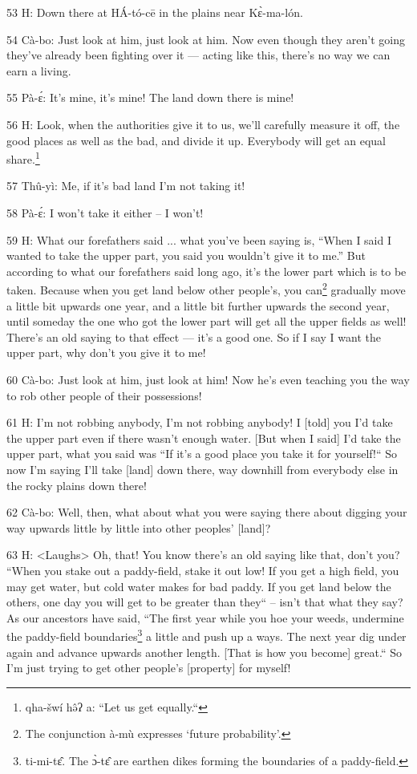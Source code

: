 53 H: Down there at HÁ-tó-cē in the plains near Kɛ̀-ma-lón.

54 Cà-bo: Just look at him, just look at him. Now even though they aren't going
they've already been fighting over it --- acting like this, there's no way we can
earn a living.

55 Pà-ɛ́: It's mine, it's mine! The land down there is mine!

56 H: Look, when the authorities give it to us, we'll carefully measure it off,
the good places as well as the bad, and divide it up. Everybody will get an equal
share.\footnote{qha-šwí hə̂ʔ a: ``Let us get equally.``}

57 Thû-yì: Me, if it's bad land I'm not taking it!

58 Pà-ɛ́: I won't take it either -- I won't!

59 H: What our forefathers said ... what you've been saying is, ``When I said I
wanted to take the upper part, you said you wouldn't give it to me.'' But according
to what our forefathers said long ago, it's the lower part which is to be taken.
Because when you get land below other people's, you can\footnote{The conjunction à-mù expresses `future probability'.} gradually move a little
bit upwards one year, and a little bit further upwards the second year, until someday
the one who got the lower part will get all the upper fields as well! There's an
old saying to that effect --- it's a good one. So if I say I want the upper part,
why don't you give it to me!

60 Cà-bo: Just look at him, just look at him! Now he's even teaching you the way
to rob other people of their possessions!

61 H: I'm not robbing anybody, I'm not robbing anybody! I [told] you I'd take the
upper part even if there wasn't enough water. [But when I said] I'd take the upper
part, what you said was ``If it's a good place you take it for yourself!``
So now I'm saying I'll take [land] down there, way downhill from everybody else
in the rocky plains down there!

62 Cà-bo: Well, then, what about what you were saying there about digging your
way upwards little by little into other peoples' [land]?

63 H: <Laughs> Oh, that! You know there's an old saying like
that, don't you? ``When you stake out a paddy-field, stake it out low!
If you get a high field, you may get water, but cold water makes for bad paddy.
If you get land below the others, one day you will get to be greater than they``
-- isn't that what they say? As our ancestors have said, ``The first year
while you hoe your weeds, undermine the paddy-field boundaries\footnote{ti-mi-tɛ̂. The ɔ̀-tɛ̂ are earthen dikes forming the boundaries of a paddy-field.} a little and
push up a ways. The next year dig under again and advance upwards another length.
[That is how you become] great.`` So I'm just trying to get other people's
[property] for myself!

